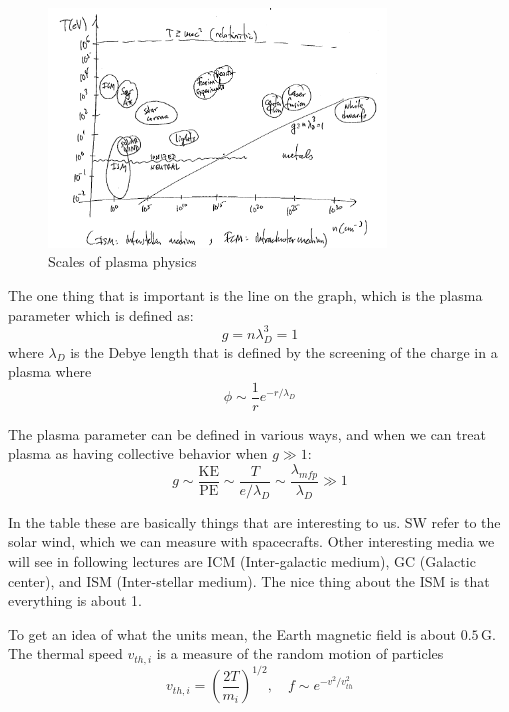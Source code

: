 \documentclass[letterpaper, 11pt]{article}
\numberwithin{equation}{section}
\numberwithin{figure}{section}
\begin{document}
\begin{figure}[h]
  \centering
  \includegraphics[width=0.8\textwidth]{scales.png}
  \caption{Scales of plasma physics}
  \label{fig:plasma}
\end{figure}

The one thing that is important is the line on the graph, which is the plasma
parameter which is defined as:
\begin{equation}
  \label{eq:1}
  g = n\lambda_D^3 = 1
\end{equation}
where $\lambda_D$ is the Debye length that is defined by the screening of the
charge in a plasma where
\begin{equation}
  \label{eq:1}
  \phi \sim \frac{1}{r}e^{-r/\lambda_D}
\end{equation}

The plasma parameter can be defined in various ways, and when we can treat
plasma as having collective behavior when $g \gg 1$:
\begin{equation}
  \label{eq:2}
  g \sim \frac{\text{KE}}{\text{PE}} \sim \frac{T}{e/\lambda_D} \sim \frac{\lambda_{mfp}}{\lambda_D} \gg 1
\end{equation}

In the table these are basically things that are interesting to us. SW refer to
the solar wind, which we can measure with spacecrafts. Other interesting media
we will see in following lectures are ICM (Inter-galactic medium), GC (Galactic
center), and ISM (Inter-stellar medium). The nice thing about the ISM is that
everything is about 1.

To get an idea of what the units mean, the Earth magnetic field is about
$0.5\,\mathrm{G}$. The thermal speed $v_{th,i}$ is a measure of the random
motion of particles
\begin{equation}
  \label{eq:3}
  v_{th,i} = \left( \frac{2T}{m_i} \right)^{1/2},\quad f \sim e^{-v^2/v_{th}^{2}}
\end{equation}
\end{document}
